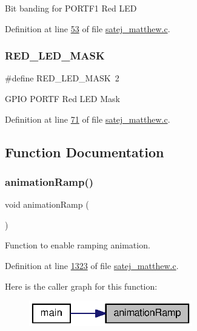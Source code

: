 Bit banding for P\+O\+R\+T\+F1 Red L\+ED 

Definition at line \mbox{\hyperlink{satej__matthew_8c_source_l00053}{53}} of file \mbox{\hyperlink{satej__matthew_8c_source}{satej\+\_\+matthew.\+c}}.

\mbox{\label{satej__matthew_8c_a2de27af622c55526783a345c21cec42e}} 
\subsubsection{\texorpdfstring{RED\_LED\_MASK}{RED\_LED\_MASK}}
{\footnotesize\ttfamily \#define R\+E\+D\+\_\+\+L\+E\+D\+\_\+\+M\+A\+SK~2}

G\+P\+IO P\+O\+R\+TF Red L\+ED Mask 

Definition at line \mbox{\hyperlink{satej__matthew_8c_source_l00071}{71}} of file \mbox{\hyperlink{satej__matthew_8c_source}{satej\+\_\+matthew.\+c}}.



\subsection{Function Documentation}
\mbox{\label{satej__matthew_8c_ae9ae5be10d7512aa7f78c8cc37cd8bb8}} 
\subsubsection{\texorpdfstring{animationRamp()}{animationRamp()}}
{\footnotesize\ttfamily void animation\+Ramp (\begin{DoxyParamCaption}{ }\end{DoxyParamCaption})}



Function to enable ramping animation. 



Definition at line \mbox{\hyperlink{satej__matthew_8c_source_l01323}{1323}} of file \mbox{\hyperlink{satej__matthew_8c_source}{satej\+\_\+matthew.\+c}}.

Here is the caller graph for this function\+:
\nopagebreak
\begin{figure}[H]
\begin{center}
\leavevmode
\includegraphics[width=202pt]{satej__matthew_8c_ae9ae5be10d7512aa7f78c8cc37cd8bb8_icgraph}
\end{center}
\end{figure}
\mbox{\label{satej__matthew_8c_ae0e2b59e29ecdbadeb6bfa1a9efa5a85}} 
